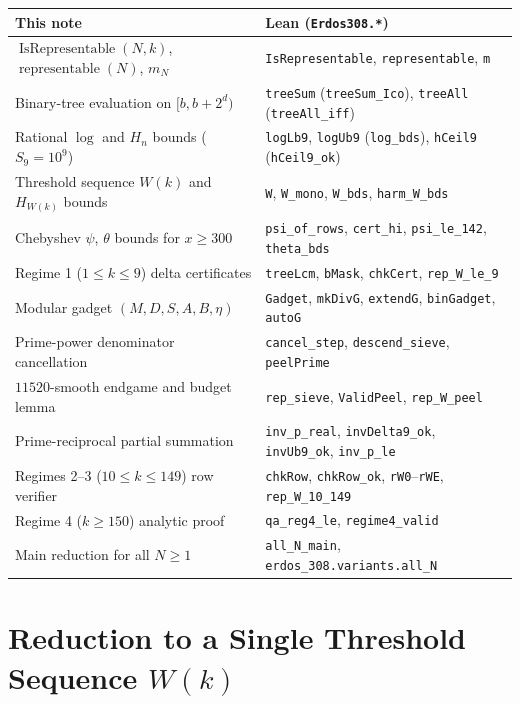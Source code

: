 \documentclass[11pt,a4paper]{amsart}
\theoremstyle{remark}
\newcommand{\Rep}{\operatorname{IsRepresentable}}
\newcommand{\repSet}{\operatorname{representable}}
\begin{document}
\begingroup
\small
\begin{longtable}{@{}>{\raggedright\arraybackslash}p{}>{\raggedright\arraybackslash}p{}@{}}
\hline
This note & Lean (\texttt{Erdos308.*}) \\
\hline
\endhead
$\Rep(N, k)$, $\repSet(N)$, $m_N$ & \texttt{IsRepresentable}, \texttt{representable}, \texttt{m} \\
Binary-tree evaluation on $[b, b + 2^d)$ & \texttt{treeSum} (\texttt{treeSum\_Ico}), \texttt{treeAll} (\texttt{treeAll\_iff}) \\
Rational $\log$ and $H_n$ bounds ($S_9 = 10^9$) & \texttt{logLb9}, \texttt{logUb9} (\texttt{log\_bds}), \texttt{hCeil9} (\texttt{hCeil9\_ok}) \\
Threshold sequence $W(k)$ and $H_{W(k)}$ bounds & \texttt{W}, \texttt{W\_mono}, \texttt{W\_bds}, \texttt{harm\_W\_bds} \\
Chebyshev $\psi$, $\theta$ bounds for $x \ge 300$ & \texttt{psi\_of\_rows}, \texttt{cert\_hi}, \texttt{psi\_le\_142}, \texttt{theta\_bds} \\
Regime 1 ($1 \le k \le 9$) delta certificates & \texttt{treeLcm}, \texttt{bMask}, \texttt{chkCert}, \texttt{rep\_W\_le\_9} \\
Modular gadget $(M, D, S, A, B, \eta)$ & \texttt{Gadget}, \texttt{mkDivG}, \texttt{extendG}, \texttt{binGadget}, \texttt{autoG} \\
Prime-power denominator cancellation & \texttt{cancel\_step}, \texttt{descend\_sieve}, \texttt{peelPrime} \\
$11520$-smooth endgame and budget lemma & \texttt{rep\_sieve}, \texttt{ValidPeel}, \texttt{rep\_W\_peel} \\
Prime-reciprocal partial summation & \texttt{inv\_p\_real}, \texttt{invDelta9\_ok}, \texttt{invUb9\_ok}, \texttt{inv\_p\_le} \\
Regimes 2--3 ($10 \le k \le 149$) row verifier & \texttt{chkRow}, \texttt{chkRow\_ok}, \texttt{rW0}--\texttt{rWE}, \texttt{rep\_W\_10\_149} \\
Regime 4 ($k \ge 150$) analytic proof & \texttt{qa\_reg4\_le}, \texttt{regime4\_valid} \\
Main reduction for all $N \ge 1$ & \texttt{all\_N\_main}, \texttt{erdos\_308.variants.all\_N} \\
\hline
\end{longtable}
\endgroup

\section{\texorpdfstring{Reduction to a Single Threshold Sequence $W(k)$}{Reduction to a Single Threshold Sequence W(k)}}
\end{document}
